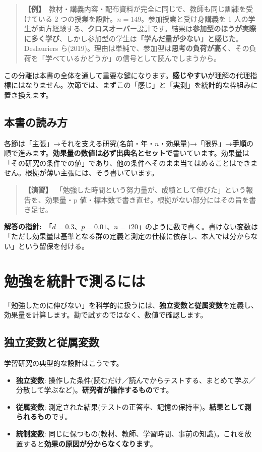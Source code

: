 \documentclass{article}
\begin{document}
\begin{quote}
\textbf{【例】}\ 教材・講義内容・配布資料が完全に同じで、教師も同じ訓練を受けている 2 つの授業を設計。\(n = 149\)。参加授業と受け身講義を 1 人の学生が両方経験する、\textbf{クロスオーバー}設計です。結果は\textbf{参加型のほうが実際に多く学び}、しかし参加型の学生は\textbf{「学んだ量が少ない」と感じた}。Deslauriers ら(2019)。理由は単純で、参加型は\textbf{思考の負荷が高く}、その負荷を「学べているかどうか」の信号として読んでしまうから。
\end{quote}

この分離は本書の全体を通して重要な鍵になります。\textbf{感じやすい}が理解の代理指標にはなりません。次節では、まずこの「感じ」と「実測」を統計的な枠組みに置き換えます。

\subsection{本書の読み方}

各節は「主張」→それを支える研究(名前・年・\(n\)・効果量)→「限界」→\textbf{手順}の順で進みます。\textbf{効果量の数値は必ず出典名とセットで}書いています。効果量は「その研究の条件での値」であり、他の条件へそのまま当てはめることはできません。根拠が薄い主張には、そう書いています。

\begin{quote}
\textbf{【演習】}\ 「勉強した時間という努力量が、成績として伸びた」という報告を、効果量・p 値・標本数で書き直せ。根拠がない部分にはその旨を書き足せ。
\end{quote}

\textbf{解答の指針:}\ 「\(d = 0.3\)、\(p = 0.01\)、\(n = 120\)」のように数で書く。書けない変数は「ただし効果量は基準となる群の定義と測定の仕様に依存し、本人では分からない」という留保を付ける。

\section{勉強を統計で測るには}

「勉強したのに伸びない」を科学的に扱うには、\textbf{独立変数と従属変数}を定義し、効果量を計算します。勘で試すのではなく、数値で確認します。

\subsection{独立変数と従属変数}

学習研究の典型的な設計はこうです。

\begin{itemize}
\item \textbf{独立変数}: 操作した条件(読むだけ／読んでからテストする、まとめて学ぶ／分散して学ぶなど)。\textbf{研究者が操作するもの}です。
\item \textbf{従属変数}: 測定された結果(テストの正答率、記憶の保持率)。\textbf{結果として測られるもの}です。
\item \textbf{統制変数}: 同じに保つもの(教材、教師、学習時間、事前の知識)。これを放置すると\textbf{効果の原因が分からなくなります}。
\end{itemize}
\end{document}
